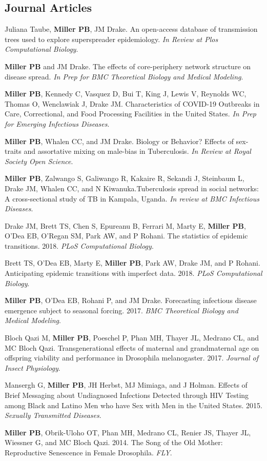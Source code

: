 \documentclass[letterpaper]{article}
\renewenvironment{itemize}{
  \begin{list}{}{
    \setlength{\leftmargin}{1.5em}
  }
}{
  \end{list}
}
\begin{document}
\subsection*{Journal Articles}

\begin{itemize}
\item  Juliana Taube, \textbf{Miller PB}, JM Drake. An open-access database of transmission trees used to explore superspreader epidemiology. \textit{In Review at Plos Computational Biology}. 
\item    \textbf{Miller PB} and JM Drake. The effects of core-periphery network structure on disease spread. \textit{In Prep for BMC Theoretical Biology and Medical Modeling}. 
\item    \textbf{Miller PB}, Kennedy C, Vasquez D, Bui T, King J, Lewis V, Reynolds WC, Thomas O,  Wenclawiak J, Drake JM. Characteristics of COVID-19 Outbreaks in Care, Correctional, and Food Processing Facilities in the United States. \textit{In Prep for Emerging Infectious Diseases}. 
\item    \textbf{Miller PB},  Whalen CC, and JM Drake. Biology or Behavior? Effects of sex-traits and assortative mixing on male-bias in Tuberculosis. \textit{In Review at Royal Society Open Science}. 
\item   \textbf{Miller PB}, Zalwango S, Galiwango R, Kakaire R, Sekandi J, Steinbaum L, Drake JM, Whalen CC, and N Kiwanuka.Tuberculosis spread in social networks: A cross-sectional study of TB in Kampala, Uganda. \textit{In review at BMC Infectious Diseases}. 
\item Drake JM, Brett TS,  Chen S, Epureanu B, Ferrari M, Marty E, \textbf{Miller PB}, O'Dea EB, O'Regan SM, Park AW, and P Rohani. The statistics of epidemic transitions. 2018. \textit{PLoS Computational Biology}. 
\item Brett TS,  O'Dea EB, Marty E, \textbf{Miller PB}, Park AW, Drake JM, and P Rohani. Anticipating epidemic transitions with imperfect data. 2018. \textit{PLoS Computational Biology}. 
\item \textbf{Miller PB}, O'Dea EB, Rohani P, and JM Drake. Forecasting infectious disease emergence subject to seasonal forcing. 2017. \textit{BMC Theoretical Biology and Medical Modeling}.
\item Bloch Qazi M, \textbf{Miller PB}, Poeschel P, Phan MH, Thayer JL, Medrano CL, and MC Bloch Qazi. Transgenerational effects of maternal and grandmaternal age on offspring viability and performance in Drosophila melanogaster. 2017. \textit{Journal of Insect Physiology}.
\item Mansergh G, \textbf{Miller PB}, JH Herbst, MJ Mimiaga, and J Holman. Effects of Brief Messaging about Undiagnosed Infections Detected through HIV Testing among Black and Latino Men who have Sex with Men in the United States. 2015. \textit{Sexually Transmitted Diseases}.
\item \textbf{Miller PB}, Obrik-Uloho OT, Phan MH, Medrano CL, Renier JS, Thayer JL, Wiessner G, and MC Bloch Qazi. 2014. The Song of the Old Mother: Reproductive Senescence in Female Drosophila. \textit{FLY}.
\end{itemize}
\end{document}
